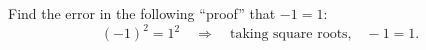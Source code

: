 Find the error in the following ``proof'' that $-1=1$:
\[
(-1)^2=1^2\quad\Longrightarrow\quad\text{taking square roots,}\quad -1=1 .
\]

